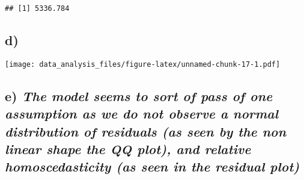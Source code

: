 \documentclass[
]{article}
\newenvironment{Shaded}{\begin{snugshade}}{\end{snugshade}}
\newcommand{\AttributeTok}[1]{\textcolor[rgb]{0.77,0.63,0.00}{#1}}
\newcommand{\DecValTok}[1]{\textcolor[rgb]{0.00,0.00,0.81}{#1}}
\newcommand{\FunctionTok}[1]{\textcolor[rgb]{0.00,0.00,0.00}{#1}}
\newcommand{\NormalTok}[1]{#1}
\newcommand{\SpecialCharTok}[1]{\textcolor[rgb]{0.00,0.00,0.00}{#1}}
\newcommand{\StringTok}[1]{\textcolor[rgb]{0.31,0.60,0.02}{#1}}
\begin{document}
\begin{verbatim}
## [1] 5336.784
\end{verbatim}

\hypertarget{d}{%
\subsection{d)}\label{d}}

\begin{Shaded}
\end{Shaded}

\texttt{[image: data\_analysis\_files/figure-latex/unnamed-chunk-17-1.pdf]}

\hypertarget{e-the-model-seems-to-sort-of-pass-of-one-assumption-as-we-do-not-observe-a-normal-distribution-of-residuals-as-seen-by-the-non-linear-shape-the-qq-plot-and-relative-homoscedasticity-as-seen-in-the-residual-plot}{%
\subsection{\texorpdfstring{e) \emph{The model seems to sort of pass of
one assumption as we do not observe a normal distribution of residuals
(as seen by the non linear shape the QQ plot), and relative
homoscedasticity (as seen in the residual
plot)}}{e) The model seems to sort of pass of one assumption as we do not observe a normal distribution of residuals (as seen by the non linear shape the QQ plot), and relative homoscedasticity (as seen in the residual plot)}}\label{e-the-model-seems-to-sort-of-pass-of-one-assumption-as-we-do-not-observe-a-normal-distribution-of-residuals-as-seen-by-the-non-linear-shape-the-qq-plot-and-relative-homoscedasticity-as-seen-in-the-residual-plot}}
\end{document}
